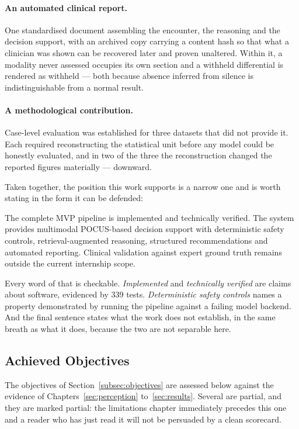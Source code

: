 \paragraph{An automated clinical report.} One standardised document assembling the encounter,
the reasoning and the decision support, with an archived copy carrying a content hash so that
what a clinician was shown can be recovered later and proven unaltered. Within it, a modality
never assessed occupies its own section and a withheld differential is rendered as withheld
--- both because absence inferred from silence is indistinguishable from a normal result.

\paragraph{A methodological contribution.} Case-level evaluation was established for three
datasets that did not provide it. Each required reconstructing the statistical unit before any
model could be honestly evaluated, and in two of the three the reconstruction changed the
reported figures materially --- downward.

\medskip
Taken together, the position this work supports is a narrow one and is worth stating in the
form it can be defended:

\begin{keystatement}
The complete MVP pipeline is implemented and technically verified. The system provides
multimodal POCUS-based decision support with deterministic safety controls,
retrieval-augmented reasoning, structured recommendations and automated reporting. Clinical
validation against expert ground truth remains outside the current internship scope.
\end{keystatement}

Every word of that is checkable. \emph{Implemented} and \emph{technically verified} are claims
about software, evidenced by 339 tests. \emph{Deterministic safety controls} names a property
demonstrated by running the pipeline against a failing model backend. And the final sentence
states what the work does not establish, in the same breath as what it does, because the two
are not separable here.

\subsection{Achieved Objectives}
\label{subsec:conclusion-objectives}

The objectives of Section~\ref{subsec:objectives} are assessed below against the evidence of
Chapters~\ref{sec:perception} to~\ref{sec:results}. Several are partial, and they are marked
partial: the limitations chapter immediately precedes this one and a reader who has just read it
will not be persuaded by a clean scorecard.

